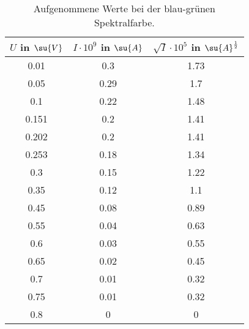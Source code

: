\begin{table}
  \centering
  \label{tab:Gelb_Komplett}
  \caption{Aufgenommene Werte bei der blau-grünen Spektralfarbe.}
  \begin{tabular}{c c c}
    \toprule
    $U$ in $\su{V}$ & $I\cdot 10^{9}$ in $\su{A}$ & $\sqrt{I}\cdot10^{5}$ in $\su{A}^{\frac{1}{2}}$ \\
    \midrule
    0.01  & 0.3  & 1.73 \\
    0.05  & 0.29 & 1.7  \\
    0.1   & 0.22 & 1.48 \\
    0.151 & 0.2  & 1.41 \\
    0.202 & 0.2  & 1.41 \\
    0.253 & 0.18 & 1.34 \\
    0.3   & 0.15 & 1.22 \\
    0.35  & 0.12 & 1.1  \\
    0.45  & 0.08 & 0.89 \\
    0.55  & 0.04 & 0.63 \\
    0.6   & 0.03 & 0.55 \\
    0.65  & 0.02 & 0.45 \\
    0.7   & 0.01 & 0.32 \\
    0.75  & 0.01 & 0.32 \\
    0.8   & 0    & 0    \\
    \bottomrule
  \end{tabular}
\end{table}
